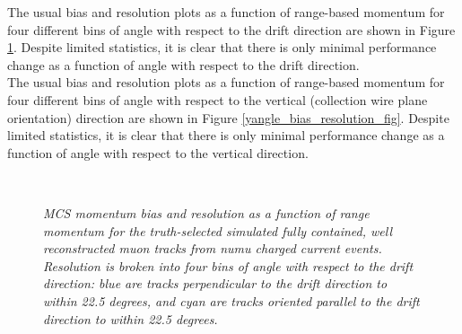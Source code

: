 The usual bias and resolution plots as a function of range-based momentum for four different bins of angle with respect to the drift direction are shown in Figure \ref{xangle_bias_resolution_fig}. Despite limited statistics, it is clear that there is only minimal performance change as a function of angle with respect to the drift direction.\\

The usual bias and resolution plots as a function of range-based momentum for four different bins of angle with respect to the vertical (collection wire plane orientation) direction are shown in Figure \ref{yangle_bias_resolution_fig}. Despite limited statistics, it is clear that there is only minimal performance change as a function of angle with respect to the vertical direction.\\



\begin{figure}
\centering
\mbox{
	\quad
	}
\caption{\textit{MCS momentum bias and resolution as a function of range momentum for the truth-selected simulated fully contained, well reconstructed muon tracks from numu charged current events. Resolution is broken into four bins of angle with respect to the drift direction: blue are tracks perpendicular to the drift direction to within 22.5 degrees, and cyan are tracks oriented parallel to the drift direction to within 22.5 degrees.}}
\label{xangle_bias_resolution_fig}
\end{figure}


